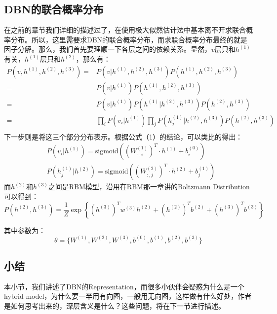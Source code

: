 \documentclass[a4paper]{article}
\begin{document}
\subsection{DBN的联合概率分布}
在之前的章节我们详细的描述过了，在使用极大似然估计法中基本离不开求联合概率分布。所以，这里需要求DBN的联合概率分布，而求联合概率分布最终的就是因子分解。那么，我们首先要理顺一下各层之间的依赖关系。显然，$v$层只和$h^{(1)}$有关，$h^{(1)}$层只和$h^{(2)}$，那么有：
\begin{equation}
    \begin{split}
        P(v,h^{(1)},h^{(2)},h^{(3)}) = & P(v|h^{(1)},h^{(2)},h^{(3)})P(h^{(1)},h^{(2)},h^{(3)}) \\
        = & P(v|h^{(1)})P(h^{(1)},h^{(2)},h^{(3)}) \\
        = & P(v|h^{(1)})P(h^{(1)}|h^{(2)},h^{(3)})P(h^{(2)},h^{(3)}) \\
        = & \prod_i P(v_i|h^{(1)}) \prod_j P(h^{(1)}_j|h^{(2)},h^{(3)})P(h^{(2)},h^{(3)}) \\
    \end{split}
\end{equation}
下一步则是将这三个部分分布表示。根据公式（1）的结论，可以类比的得出：
\begin{equation}
    \begin{split}
       &  P(v_i|h^{(1)}) = \text{sigmoid}\left(\left(W^{(1)}_{:,i}\right)^T \cdot h^{(1)} + b^{(0)}_i\right) \\
       &  P(h_j^{(1)}|h^{(2)}) = \text{sigmoid}\left(\left(W^{(2)}_{:,j}\right)^T \cdot h^{(2)} + b^{(1)}_j\right)
    \end{split}
\end{equation}
而$h^{(2)}$和$h^{(3)}$之间是RBM模型，沿用在RBM那一章讲的Boltzmann Distribution可以得到：
\begin{equation}
    P(h^{(2)},h^{(3)}) = \frac{1}{Z} \exp\left\{ \left(h^{(3)}\right)^Tw^{(3)}h^{(2)} + \left(h^{(2)}\right)^T b^{(2)} + \left(h^{(3)}\right)^T b^{(3)} \right\}
\end{equation}

其中参数为：
\begin{equation}
    \theta = \{ W^{(1)},W^{(2)},W^{(3)},b^{(0)},b^{(1)},b^{(2)},b^{(3)} \}
\end{equation}

\subsection{小结}
本小节，我们讲述了DBN的Representation，而很多小伙伴会疑惑为什么是一个hybrid model，为什么要一半用有向图，一般用无向图，这样做有什么好处，作者是如何思考出来的，深层含义是什么？这些问题，将在下一节进行描述。
\end{document}
